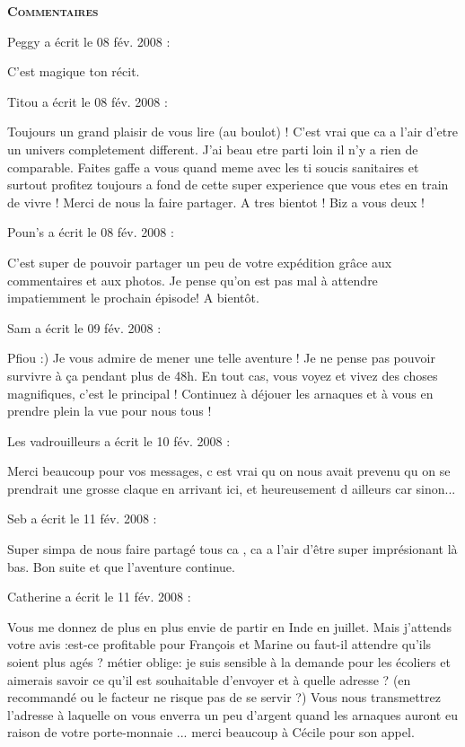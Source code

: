 \bigskip
\textbf{\textsc{Commentaires}}

\medskip
Peggy a écrit le 08 fév. 2008 :
\begin{displayquote}
C'est magique ton récit.
\end{displayquote}

\medskip
Titou a écrit le 08 fév. 2008 :
\begin{displayquote}
Toujours un grand plaisir de vous lire (au boulot) ! C'est vrai que ca a l'air d'etre un univers completement different. J'ai beau etre parti loin il n'y a rien de comparable. Faites gaffe a vous quand meme avec les ti soucis sanitaires et surtout profitez toujours a fond de cette super experience que vous etes en train de vivre ! Merci de nous la faire partager. A tres bientot ! Biz a vous deux !
\end{displayquote}

\medskip
Poun's a écrit le 08 fév. 2008 :
\begin{displayquote}
C'est super de pouvoir partager un peu de votre expédition grâce aux commentaires et aux photos. Je pense qu'on est pas mal à attendre impatiemment le prochain épisode!
A bientôt.
\end{displayquote}

\medskip
Sam a écrit le 09 fév. 2008 :
\begin{displayquote}
Pfiou :) Je vous admire de mener une telle aventure ! Je ne pense pas pouvoir survivre à ça pendant plus de 48h.
En tout cas, vous voyez et vivez des choses magnifiques, c'est le principal ! Continuez à déjouer les arnaques et à vous en prendre plein la vue pour nous tous !
\end{displayquote}

\medskip
Les vadrouilleurs a écrit le 10 fév. 2008 :
\begin{displayquote}
Merci beaucoup pour vos messages, c est vrai qu on nous avait prevenu qu on se prendrait une grosse claque en arrivant ici, et heureusement d ailleurs car sinon...
\end{displayquote}

\medskip
Seb a écrit le 11 fév. 2008 :
\begin{displayquote}
Super simpa de nous faire partagé tous ca , ca a l'air d'être super imprésionant là bas.
Bon suite et que l'aventure continue.
\end{displayquote}

\medskip
Catherine a écrit le 11 fév. 2008 :
\begin{displayquote}
Vous me donnez de plus en plus envie de partir en Inde en juillet. Mais j'attends votre avis :est-ce profitable pour François et Marine ou faut-il attendre qu'ils soient plus agés ?
        métier oblige: je suis sensible à la demande pour les écoliers et aimerais savoir ce qu'il est souhaitable d'envoyer et à quelle adresse ? (en recommandé ou le facteur ne risque pas de se servir ?)
        Vous nous transmettrez l'adresse à laquelle on vous enverra un peu d'argent quand les arnaques auront eu raison de votre porte-monnaie ...
                merci beaucoup à Cécile pour son appel.
\end{displayquote}

